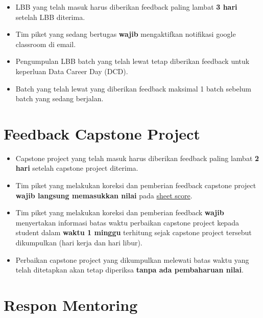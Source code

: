 \documentclass[
]{book}
\providecommand{\tightlist}{%
  \setlength{\itemsep}{0pt}\setlength{\parskip}{0pt}}
\begin{document}
\begin{itemize}
\tightlist
\item
  LBB yang telah masuk harus diberikan feedback paling lambat \textbf{3 hari} setelah LBB diterima.
\item
  Tim piket yang sedang bertugas \textbf{wajib} mengaktifkan notifikasi google classroom di email.
\item
  Pengumpulan LBB batch yang telah lewat tetap diberikan feedback untuk keperluan Data Career Day (DCD).
\item
  Batch yang telah lewat yang diberikan feedback maksimal 1 batch sebelum batch yang sedang berjalan.
\end{itemize}

\hypertarget{feedback-capstone-project}{%
\section{Feedback Capstone Project}\label{feedback-capstone-project}}

\begin{itemize}
\tightlist
\item
  Capstone project yang telah masuk harus diberikan feedback paling lambat \textbf{2 hari} setelah capstone project diterima.
\item
  Tim piket yang melakukan koreksi dan pemberian feedback capstone project \textbf{wajib langsung memasukkan nilai} pada \href{https://docs.google.com/spreadsheets/d/1cGJ0pn9k9gKCBnceWVwaL9D7BBDMNjLh8uPYlaBlJi8/edit?usp=sharing}{sheet score}.
\item
  Tim piket yang melakukan koreksi dan pemberian feedback \textbf{wajib} menyertakan informasi batas waktu perbaikan capstone project kepada student dalam \textbf{waktu 1 minggu} terhitung sejak capstone project tersebut dikumpulkan (hari kerja dan hari libur).
\item
  Perbaikan capstone project yang dikumpulkan melewati batas waktu yang telah ditetapkan akan tetap diperiksa \textbf{tanpa ada pembaharuan nilai}.
\end{itemize}

\hypertarget{respon-mentoring}{%
\section{Respon Mentoring}\label{respon-mentoring}}
\end{document}
